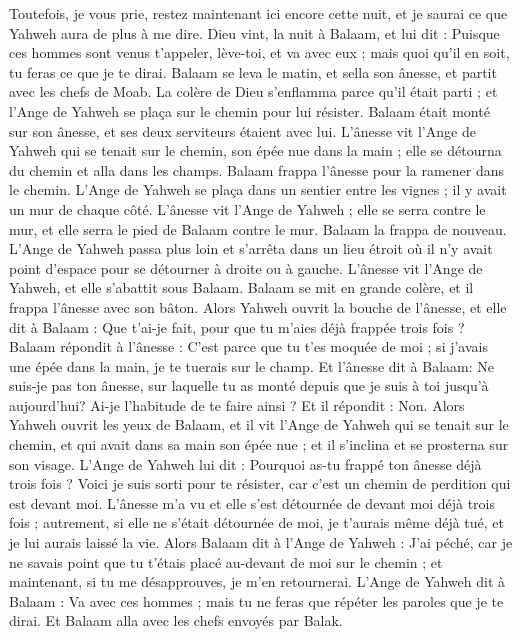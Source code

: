 \begin{multicols}{2}
Toutefois, je vous prie, restez maintenant ici encore cette nuit, et je saurai ce que Yahweh aura de plus à me dire.
Dieu vint, la nuit à Balaam, et lui dit : Puisque ces hommes sont venus t'appeler, lève-toi, et va avec eux ; mais quoi qu'il en soit, tu feras ce que je te dirai.
Balaam se leva le matin, et sella son ânesse, et partit avec les chefs de Moab.
La colère de Dieu s'enflamma parce qu'il était parti ; et l'Ange de Yahweh se plaça sur le chemin pour lui résister. Balaam était monté sur son ânesse, et ses deux serviteurs étaient avec lui.
L'ânesse vit l'Ange de Yahweh qui se tenait sur le chemin, son épée nue dans la main ; elle se détourna du chemin et alla dans les champs. Balaam frappa l'ânesse pour la ramener dans le chemin.
L'Ange de Yahweh se plaça dans un sentier entre les vignes ; il y avait un mur de chaque côté.
L'ânesse vit l'Ange de Yahweh ; elle se serra contre le mur, et elle serra le pied de Balaam contre le mur. Balaam la frappa de nouveau.
L'Ange de Yahweh passa plus loin et s'arrêta dans un lieu étroit où il n'y avait point d'espace pour se détourner à droite ou à gauche.
L'ânesse vit l'Ange de Yahweh, et elle s'abattit sous Balaam. Balaam se mit en grande colère, et il frappa l'ânesse avec son bâton.
Alors Yahweh ouvrit la bouche de l'ânesse, et elle dit à Balaam : Que t'ai-je fait, pour que tu m'aies déjà frappée trois fois ?
Balaam répondit à l'ânesse : C'est parce que tu t'es moquée de moi ; si j'avais une épée dans la main, je te tuerais sur le champ.
Et l'ânesse dit à Balaam: Ne suis-je pas ton ânesse, sur laquelle tu as monté depuis que je suis à toi jusqu'à aujourd'hui? Ai-je l'habitude de te faire ainsi ? Et il répondit : Non.
Alors Yahweh ouvrit les yeux de Balaam, et il vit l'Ange de Yahweh qui se tenait sur le chemin, et qui avait dans sa main son épée nue ; et il s'inclina et se prosterna sur son visage.
L'Ange de Yahweh lui dit : Pourquoi as-tu frappé ton ânesse déjà trois fois ? Voici je suis sorti pour te résister, car c'est un chemin de perdition qui est devant moi.
L'ânesse m'a vu et elle s'est détournée de devant moi déjà trois fois ; autrement, si elle ne s'était détournée de moi, je t'aurais même déjà tué, et je lui aurais laissé la vie.
Alors Balaam dit à l'Ange de Yahweh : J'ai péché, car je ne savais point que tu t'étais placé au-devant de moi sur le chemin ; et maintenant, si tu me désapprouves, je m'en retournerai.
L'Ange de Yahweh dit à Balaam : Va avec ces hommes ; mais tu ne feras que répéter les paroles que je te dirai. Et Balaam alla avec les chefs envoyés par Balak.

\end{multicols}
